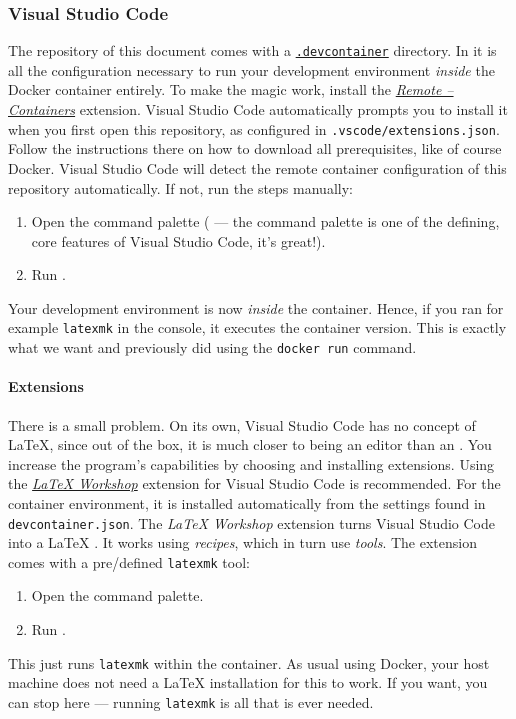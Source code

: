 \subsubsection{Visual Studio Code}

The repository of this document comes with a \href{https://github.com/microsoft/vscode-dev-containers}{\texttt{.devcontainer}} directory.
In it is all the configuration necessary to run your development environment \emph{inside} the Docker container entirely.
To make the magic work, install the \href{https://marketplace.visualstudio.com/items?itemName=ms-vscode-remote.remote-containers}{\emph{Remote -- Containers}} extension.
Visual Studio Code automatically prompts you to install it when you first open this repository, as configured in \texttt{.vscode/extensions.json}.
Follow the instructions there on how to download all prerequisites, like of course Docker.
Visual Studio Code will detect the remote container configuration of this repository automatically.
If not, run the steps manually:
\begin{enumerate}
    \item Open the command palette ( --- the command palette is one of the defining, core features of Visual Studio Code, it's great!).
    \item Run .
\end{enumerate}
Your development environment is now \emph{inside} the container.
Hence, if you ran for example \texttt{latexmk} in the console, it executes the container version.
This is exactly what we want and previously did using the \texttt{docker run} command.

\paragraph{Extensions}
There is a small problem.
On its own, Visual Studio Code has no concept of \LaTeX{}, since out of the box, it is much closer to being an editor than an .
You increase the program's capabilities by choosing and installing extensions.
Using the \href{https://marketplace.visualstudio.com/items?itemName=James-Yu.latex-workshop}{\emph{LaTeX Workshop}} extension for Visual Studio Code is recommended.
For the container environment, it is installed automatically from the settings found in \texttt{devcontainer.json}.
The \emph{LaTeX Workshop} extension turns Visual Studio Code into a \LaTeX{} .
It works using \emph{recipes}, which in turn use \emph{tools}.
The extension comes with a pre\-/defined \texttt{latexmk} tool:
\begin{enumerate}
    \item Open the command palette.
    \item Run .
\end{enumerate}
This just runs \texttt{latexmk} within the container.
As usual using Docker, your host machine does not need a \LaTeX{} installation for this to work.
If you want, you can stop here --- running \texttt{latexmk} is all that is ever needed.

